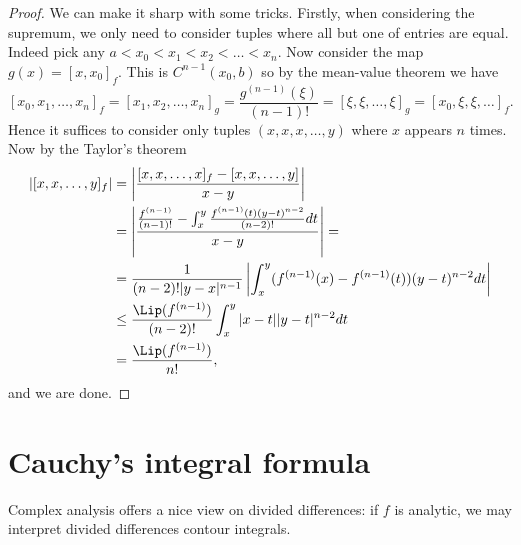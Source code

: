 \begin{proof}
	We can make it sharp with some tricks. Firstly, when considering the supremum, we only need to consider tuples where all but one of entries are equal. Indeed pick any $a < x_{0} < x_{1} < x_{2} < \ldots < x_{n}$. Now consider the map $g(x) = [x, x_{0}]_{f}$. This is $C^{n - 1}(x_{0}, b)$ so by the mean-value theorem we have
	\[
		[x_{0}, x_{1}, \ldots, x_{n}]_{f} = [x_{1}, x_{2}, \ldots, x_{n}]_{g} = \frac{g^{(n - 1)}(\xi)}{(n - 1)!} = [\xi, \xi, \ldots, \xi]_{g} = [x_{0}, \xi, \xi, \ldots]_{f}.
	\]
	Hence it suffices to consider only tuples $(x, x, x, \ldots, y)$ where $x$ appears $n$ times. Now by the Taylor's theorem
	\begin{align*}
		\left|[x, x, \ldots, y]_{f}\right| &= \left|\frac{[x, x, \ldots, x]_{f} - [x, x, \ldots, y]}{x - y} \right| \\
		&= \left|\frac{\frac{f^{(n - 1)}}{(n - 1)!} - \int_{x}^{y} \frac{f^{(n - 1)}(t) (y - t)^{n - 2}}{(n - 2)!} dt}{x - y} \right| = \\
		&= \frac{1}{(n - 2)!|y - x|^{n - 1}} \left|\int_{x}^{y} (f^{(n - 1)}(x) - f^{(n - 1)}(t)) (y - t)^{n - 2} dt \right| \\
		&\leq \frac{\Lip(f^{(n - 1)})}{(n - 2)!} \int_{x}^{y} |x - t| |y - t|^{n - 2} dt \\
		&= \frac{\Lip(f^{(n - 1)})}{n!},
	\end{align*}
	and we are done.
\end{proof}

\section{Cauchy's integral formula}

Complex analysis offers a nice view on divided differences: if $f$ is analytic, we may interpret divided differences contour integrals.

